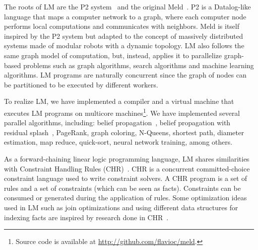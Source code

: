 The roots of LM are the P2 system~\cite{Loo-condie-garofalakis-p2} and the original Meld~\cite{ashley-rollman-derosa-iros07wksp,ashley-rollman-iclp09}.
P2 is a Datalog-like language that maps a computer network
to a graph, where each computer node performs local computations and communicates with neighbors.
Meld is itself inspired by the P2 system but adapted to the concept of massively distributed systems
made of modular robots with a dynamic topology.
LM also follows the same graph model of computation, but, instead, applies it to parallelize graph-based problems such as
graph algorithms, search algorithms and machine learning algorithms. LM programs are naturally concurrent since the graph of nodes
can be partitioned to be executed by different workers.

To realize LM, we have implemented a compiler and a virtual machine that executes LM programs on multicore machines\footnote{Source code is available at \url{http://github.com/flavioc/meld}.}.
We have implemented several parallel algorithms, including: belief propagation~\cite{Gonzalez+al:aistats09paraml},
belief propagation with residual splash~\cite{Gonzalez+al:aistats09paraml}, PageRank, graph coloring,
N-Queens, shortest path, diameter estimation, map reduce, quick-sort, neural network training, among others.

\iffalse
There are also non logical based systems intended to solve graph-based problems such as Dryad, Pregel or GraphLab.
The Dryad system~\cite{Isard:2007:DDD:1272996.1273005} is a framework that combines computational vertices
with communication channels (edges) to form a data-flow graph. 
The Pregel system~\cite{Malewicz:2010:PSL:1807167.1807184} is also graph-based, although programs must be represented
as a sequence of iterations where each iteration is composed of computation and message passing.
Finally, GraphLab~\cite{GraphLab2010} is a library for developing parallel (graph-based) machine learning algorithms in C++
and provides several schedulers to dictate the order of node execution.
\fi

As a forward-chaining linear logic programming language, LM shares similarities with Constraint Handling Rules (CHR)~\cite{Betz:2005kx,DBLP:journals/corr/abs-1006-3039}.
CHR is a concurrent committed-choice constraint language used to write constraint solvers. A CHR program is a set of rules and
a set of constraints (which can be seen as facts). Constraints can be consumed or generated during the application of rules.
Some optimization ideas used in LM such as join optimizations and using different data structures for indexing facts
are inspired by research done in CHR~\cite{DBLP:journals/corr/cs-PL-0408025}.

